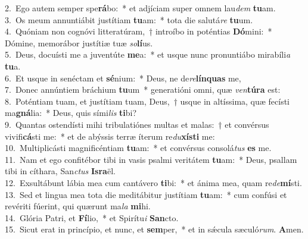 {2.~}Ego autem semper spe\textbf{rá}bo:~* et adjíciam super omnem lau\textit{dem} \textbf{tu}am.\\
{3.~}Os meum annuntiábit justítiam \textbf{tu}am:~* tota die salutá\textit{re} \textbf{tu}um.\\
{4.~}Quóniam non cognóvi litteratúram,~† introíbo in poténtias \textbf{Dó}mini:~* Dómine, memorábor justítiæ tuæ \textit{so}\textbf{lí}us.\\
{5.~}Deus, docuísti me a juventúte \textbf{me}a:~* et usque nunc pronuntiábo mirabíli\textit{a} \textbf{tu}a.\\
{6.~}Et usque in senéctam et \textbf{sé}nium:~* Deus, ne de\textit{re}\textbf{lín}\textbf{quas} me,\\
{7.~}Donec annúntiem bráchium \textbf{tu}um~* generatióni omni, quæ \textit{ven}\textbf{tú}\textbf{ra} est:\\
{8.~}Poténtiam tuam, et justítiam tuam, Deus,~† usque in altíssima, quæ fecísti ma\textbf{gná}lia:~* Deus, quis sími\textit{lis} \textbf{ti}bi?\\
{9.~}Quantas ostendísti mihi tribulatiónes multas et malas:~† et convérsus vivifi\textbf{cá}sti me:~* et de abýssis terræ íterum re\textit{du}\textbf{xí}\textbf{sti} me:\\
{10.~}Multiplicásti magnificéntiam \textbf{tu}am:~* et convérsus consolá\textit{tus} \textbf{es} me.\\
{11.~}Nam et ego confitébor tibi in vasis psalmi veritátem \textbf{tu}am:~* Deus, psallam tibi in cíthara, San\textit{ctus} \textbf{Is}\textbf{ra}ël.\\
{12.~}Exsultábunt lábia mea cum cantávero \textbf{ti}bi:~* et ánima mea, quam re\textit{de}\textbf{mí}sti.\\
{13.~}Sed et lingua mea tota die meditábitur justítiam \textbf{tu}am:~* cum confúsi et revériti fúerint, qui quærunt ma\textit{la} \textbf{mi}hi.\\
{14.~}Glória Patri, et \textbf{Fí}lio,~* et Spirítu\textit{i} \textbf{San}cto.\\
{15.~}Sicut erat in princípio, et nunc, et \textbf{sem}per,~* et in sǽcula sæculó\textit{rum}. \textbf{A}men.\\
